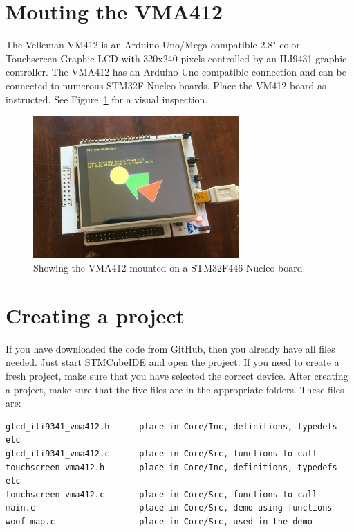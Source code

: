 \documentclass[12pt]{article}
\begin{document}
\section{Mouting the VMA412}
The Velleman VM412 is an Arduino Uno/Mega compatible 2.8" color Touchscreen Graphic LCD with 320x240 pixels controlled by an ILI9431 graphic controller.
The VMA412 has an Arduino Uno compatible connection and can be connected to numerous STM32F Nucleo boards.
Place the VM412 board as instructed. See Figure~\ref{fig:1} for a visual inspection.

\begin{figure}[!ht]
\centering
\includegraphics[width=0.7\textwidth]{glcd_demo}
\caption{Showing the VMA412 mounted on a STM32F446 Nucleo board.}
\label{fig:1}
\end{figure}


\section{Creating a project}
If you have downloaded the code from GitHub, then you already have all files needed. Just start STMCubeIDE and open the project. If you need to create a fresh project, make sure that you have selected the correct device. 
After creating a project, make sure that the five files are in the appropriate folders. These files are:

\begin{lstlisting}
glcd_ili9341_vma412.h   -- place in Core/Inc, definitions, typedefs etc
glcd_ili9341_vma412.c   -- place in Core/Src, functions to call
touchscreen_vma412.h    -- place in Core/Inc, definitions, typedefs etc
touchscreen_vma412.c    -- place in Core/Src, functions to call
main.c                  -- place in Core/Src, demo using functions
woof_map.c              -- place in Core/Src, used in the demo
\end{lstlisting}
\end{document}
